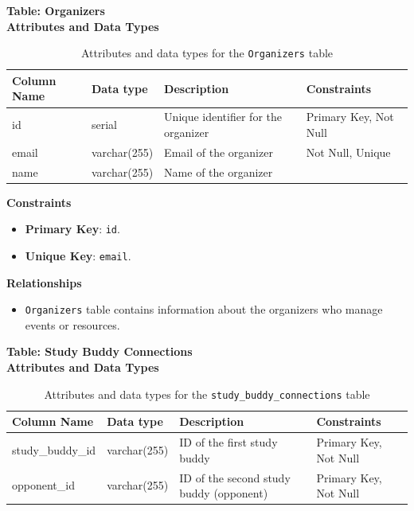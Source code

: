 \documentclass[12pt]{article}
\begin{document}
    \textbf{Table: Organizers} \\

    \textbf{Attributes and Data Types}
    \begin{table}[H]
        \centering
        \renewcommand{\arraystretch}{1.5}
        \begin{tabular}{|l|l|p{4.5cm}|l|}
        \hline
        \rowcolor[HTML]{96FFFB} 
        \textbf{Column Name} & \textbf{Data type}        & \textbf{Description}                                   & \textbf{Constraints}             \\ \hline
        id                   & serial                  & Unique identifier for the organizer                    & Primary Key, Not Null            \\ \hline
        email                & varchar(255)            & Email of the organizer                                 & Not Null, Unique                 \\ \hline
        name                 & varchar(255)            & Name of the organizer                                  &                                 \\ \hline
        \end{tabular}
        \caption{Attributes and data types for the \texttt{Organizers} table}
    \end{table}

    \noindent
    \textbf{Constraints}
    \begin{itemize}
        \item \textbf{Primary Key}: \texttt{id}.
        \item \textbf{Unique Key}: \texttt{email}.
    \end{itemize}

    \noindent
    \textbf{Relationships}
    \begin{itemize}
        \item \texttt{Organizers} table contains information about the organizers who manage events or resources.
    \end{itemize}

    \pagebreak
        
    \textbf{Table: Study Buddy Connections} \\

    \textbf{Attributes and Data Types}
    \begin{table}[H] 
        \centering 
        \renewcommand{\arraystretch}{1.5} 
        \begin{tabular}{|l|l|p{4.5cm}|l|} 
        \hline 
        \rowcolor[HTML]{96FFFB} 
        \textbf{Column Name} & \textbf{Data type} & \textbf{Description} & \textbf{Constraints} \\ \hline 
        study\_buddy\_id & varchar(255) & ID of the first study buddy & Primary Key, Not Null \\ \hline 
        opponent\_id & varchar(255) & ID of the second study buddy (opponent) & Primary Key, Not Null \\ \hline 
        \end{tabular} 
        \caption{Attributes and data types for the \texttt{study\_buddy\_connections} table} 
    \end{table}
\end{document}
